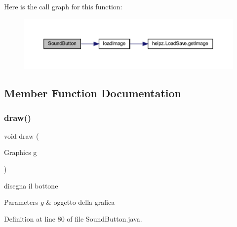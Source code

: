 Here is the call graph for this function\+:
\nopagebreak
\begin{figure}[H]
\begin{center}
\leavevmode
\includegraphics[width=350pt]{classui_1_1_sound_button_a08aaedca13e6e5245ebf8ad14a2eeeaa_cgraph}
\end{center}
\end{figure}


\subsection{Member Function Documentation}
\mbox{\label{classui_1_1_sound_button_a72fe1ffca978e99fd16994a10e7f8051}} 
\subsubsection{\texorpdfstring{draw()}{draw()}}
{\footnotesize\ttfamily void draw (\begin{DoxyParamCaption}\item[{Graphics}]{g }\end{DoxyParamCaption})}



disegna il bottone 


\begin{DoxyParams}{Parameters}
{\em g} & oggetto della grafica \\
\hline
\end{DoxyParams}


Definition at line 80 of file Sound\+Button.\+java.

